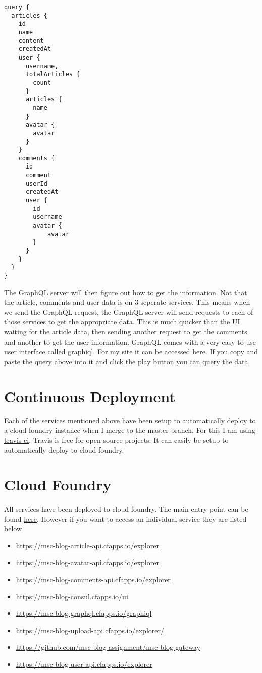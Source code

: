 \begin{verbatim}
query {
  articles {
    id
    name
    content
    createdAt
    user {
      username,
      totalArticles {
        count
      }
      articles {
        name
      }
      avatar {
        avatar
      }
    }
    comments {
      id
      comment
      userId
      createdAt
      user {
        id
        username
        avatar {
            avatar
        }
      }
    }
  }
}
\end{verbatim}
The GraphQL server will then figure out how to get the information. Not that the article, comments and user data is on 3 seperate services. This means when we send the GraphQL request, the GraphQL server will send requests to each of those services to get the appropriate data. This is much quicker than the UI waiting for the article data, then sending another request to get the comments and another to get the user information.  GraphQL comes with a very easy to use user interface called graphiql. For my site it can be accessed \href{https://msc-blog-gateway.cfapps.io/graphiql}{here}. If you copy and paste the query above into it and click the play button you can query the data.

\section{Continuous Deployment}

Each of the services mentioned above have been setup to automatically deploy to a cloud foundry instance when I merge to the master branch. For this I am using \href{https://travis-ci.org/}{travis-ci}. Travis is free for open source projects. It can easily be setup to automatically deploy to cloud foundry.

\section{Cloud Foundry}

All services have been deployed to cloud foundry. The main entry point can be found \href{https://msc-blog-gateway.cfapps.io/}{here}. However if you want to access an individual service they are listed below

\begin{itemize}
  \item \url{https://msc-blog-article-api.cfapps.io/explorer}
  \item \url{https://msc-blog-avatar-api.cfapps.io/explorer}
  \item \url{https://msc-blog-comments-api.cfapps.io/explorer}
  \item \url{https://msc-blog-consul.cfapps.io/ui}
  \item \url{https://msc-blog-graphql.cfapps.io/graphiql}
  \item \url{https://msc-blog-upload-api.cfapps.io/explorer/}
  \item \url{https://github.com/msc-blog-assignment/msc-blog-gateway}
  \item \url{https://msc-blog-user-api.cfapps.io/explorer}
\end{itemize}

